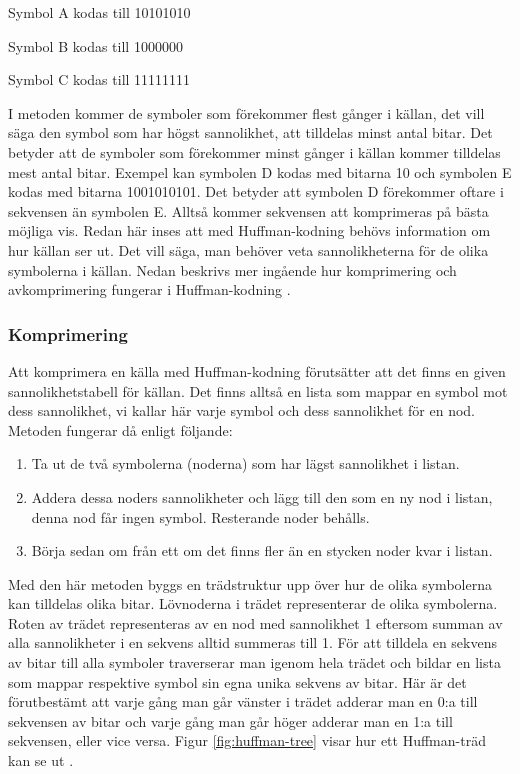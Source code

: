 \bigskip
\noindent Symbol A kodas till 10101010

\noindent Symbol B kodas till 1000000

\noindent Symbol C kodas till 11111111

\bigskip
\noindent I metoden kommer de symboler som förekommer flest gånger i källan, det vill säga den symbol som har högst sannolikhet, att tilldelas minst antal bitar. Det betyder att de symboler som förekommer minst gånger i källan kommer tilldelas mest antal bitar. Exempel kan symbolen D kodas med bitarna 10 och symbolen E kodas med bitarna 1001010101. Det betyder att symbolen D förekommer oftare i sekvensen än symbolen E. Alltså kommer sekvensen att komprimeras på bästa möjliga vis.  Redan här inses att med Huffman-kodning behövs information om hur källan ser ut. Det vill säga, man behöver veta sannolikheterna för de olika symbolerna i källan. Nedan beskrivs mer ingående hur komprimering och avkomprimering fungerar i Huffman-kodning \cite{huffmancoding2018}.
	\subsubsection{Komprimering}
	Att komprimera en källa med Huffman-kodning förutsätter att det finns en given sannolikhetstabell för källan. Det finns alltså en lista som mappar en symbol mot dess sannolikhet, vi kallar här varje symbol och dess sannolikhet för en nod. Metoden fungerar då enligt följande:
	\begin{enumerate}
	\item Ta ut de två symbolerna (noderna) som har lägst sannolikhet i listan.
	\item Addera dessa noders sannolikheter och lägg till den som en ny nod i listan, denna nod får ingen symbol. Resterande noder behålls.
	\item Börja sedan om från ett om det finns fler än en stycken noder kvar i listan.
	\end{enumerate}
	Med den här metoden byggs en trädstruktur upp över hur de olika symbolerna kan tilldelas olika bitar. Lövnoderna i trädet representerar de olika symbolerna. Roten av trädet representeras av en nod med sannolikhet 1 eftersom summan av alla sannolikheter i en sekvens alltid summeras till 1. För att tilldela en sekvens av bitar till alla symboler traverserar man igenom hela trädet och bildar en lista som mappar respektive symbol sin egna unika sekvens av bitar. Här är det förutbestämt att varje gång man går vänster i trädet adderar man en 0:a till sekvensen av bitar och varje gång man går höger adderar man en 1:a till sekvensen, eller vice versa. Figur \ref{fig:huffman-tree} visar hur ett Huffman-träd kan se ut \cite{huffmancoding2018}.

